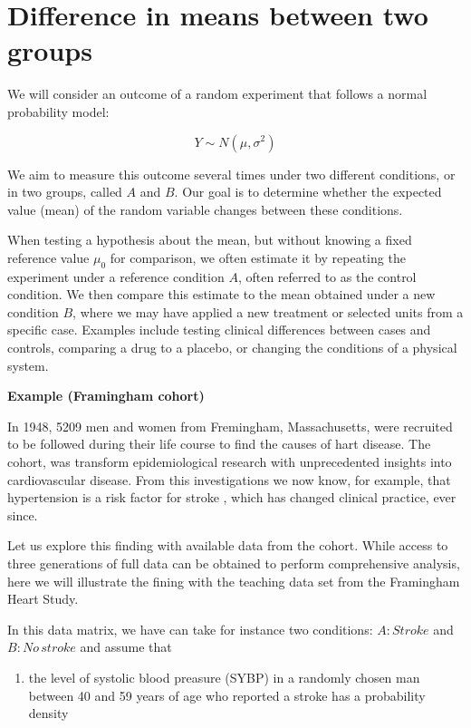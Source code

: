 \documentclass[
]{book}
\providecommand{\tightlist}{%
  \setlength{\itemsep}{0pt}\setlength{\parskip}{0pt}}
\begin{document}
\hypertarget{difference-in-means-between-two-groups}{%
\section{Difference in means between two groups}\label{difference-in-means-between-two-groups}}

We will consider an outcome of a random experiment that follows a normal probability model:

\[ Y \sim N(\mu, \sigma^2) \]

We aim to measure this outcome several times under two different conditions, or in two groups, called \(A\) and \(B\). Our goal is to determine whether the expected value (mean) of the random variable changes between these conditions.

When testing a hypothesis about the mean, but without knowing a fixed reference value \(\mu_0\) for comparison, we often estimate it by repeating the experiment under a reference condition \(A\), often referred to as the control condition. We then compare this estimate to the mean obtained under a new condition \(B\), where we may have applied a new treatment or selected units from a specific case. Examples include testing clinical differences between cases and controls, comparing a drug to a placebo, or changing the conditions of a physical system.

\textbf{Example (Framingham cohort)}

In 1948, 5209 men and women from Fremingham, Massachusetts, were recruited to be followed during their life course to find the causes of hart disease. The cohort, was transform epidemiological research with unprecedented insights into cardiovascular disease. From this investigations we now know, for example, that hypertension is a risk factor for stroke \citep{kannel1961factors}, which has changed clinical practice, ever since.

Let us explore this finding with available data from the cohort. While access to three generations of full data can be obtained to perform comprehensive analysis, here we will illustrate the fining with the teaching data set from the Framingham Heart Study.

In this data matrix, we have can take for instance two conditions: \(A:Stroke\) and \(B:No \,stroke\) and assume that

\begin{enumerate}
\def\labelenumi{\arabic{enumi})}
\tightlist
\item
  the level of systolic blood preasure (SYBP) in a randomly chosen man between 40 and 59 years of age who reported a stroke has a probability density
\end{enumerate}
\end{document}
